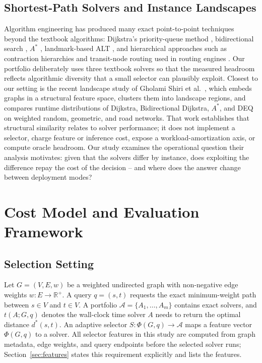 \documentclass[conference]{IEEEtran}
\begin{document}
\subsection{Shortest-Path Solvers and Instance Landscapes}
Algorithm engineering has produced many exact point-to-point techniques beyond the textbook algorithms: Dijkstra's priority-queue method \cite{dijkstra1959}, bidirectional search \cite{nicholson1966, pohl1971}, $A^*$ \cite{hart1968}, landmark-based ALT \cite{goldberg2005}, and hierarchical approaches such as contraction hierarchies and transit-node routing used in routing engines \cite{bast2016}. Our portfolio deliberately uses three textbook solvers so that the measured headroom reflects algorithmic diversity that a small selector can plausibly exploit. Closest to our setting is the recent landscape study of Gholami Shiri et al.\ \cite{gholami2026}, which embeds graphs in a structural feature space, clusters them into landscape regions, and compares runtime distributions of Dijkstra, Bidirectional Dijkstra, $A^*$, and DEQ on weighted random, geometric, and road networks. That work establishes that structural similarity relates to solver performance; it does not implement a selector, charge feature or inference cost, expose a workload-amortization axis, or compute oracle headroom. Our study examines the operational question their analysis motivates: given that the solvers differ by instance, does exploiting the difference repay the cost of the decision -- and where does the answer change between deployment modes?

\section{Cost Model and Evaluation Framework}
\label{sec:cost}

\subsection{Selection Setting}
Let $G=(V,E,w)$ be a weighted undirected graph with non-negative edge weights $w:E \to \mathbb{R}^{+}$. A query $q=(s,t)$ requests the exact minimum-weight path between $s \in V$ and $t \in V$. A portfolio $\mathcal{A}=\{A_1,\dots,A_m\}$ contains exact solvers, and $t(A;G,q)$ denotes the wall-clock time solver $A$ needs to return the optimal distance $d^{*}(s,t)$. An adaptive selector $S:\Phi(G,q) \to \mathcal{A}$ maps a feature vector $\Phi(G,q)$ to a solver. All selector features in this study are computed from graph metadata, edge weights, and query endpoints before the selected solver runs; Section~\ref{sec:features} states this requirement explicitly and lists the features.
\end{document}
